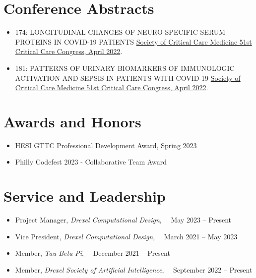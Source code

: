 \documentclass[letterpaper,11pt]{article}
\newcommand{\reusmeSubHeadingListSmallStart}{\begin{itemize}[itemsep=-4pt, parsep=4pt]}
\newcommand{\resumeSubHeadingListSmallEnd}{\end{itemize}}
\begin{document}
\section{Conference Abstracts}

\reusmeSubHeadingListSmallStart
\item\small {
    174: LONGITUDINAL CHANGES OF NEURO-SPECIFIC SERUM PROTEINS IN COVID-19 PATIENTS
    \href{https://doi.org/10.1097/01.ccm.0000807020.73561.ed}
    {Society of Critical Care Medicine 51st Critical Care Congress, April 2022}.
}

\item\small {
    181: PATTERNS OF URINARY BIOMARKERS OF IMMUNOLOGIC ACTIVATION AND SEPSIS IN PATIENTS WITH COVID-19
    \href{https://doi.org/10.1097/01.ccm.0000807048.74105.59}
    {Society of Critical Care Medicine 51st Critical Care Congress, April 2022}.
}

\resumeSubHeadingListSmallEnd

\vspace{-20pt}


\section{Awards and Honors}
\reusmeSubHeadingListSmallStart
\item\small {
    HESI GTTC Professional Development Award, Spring 2023
}

\item\small {
    Philly Codefest 2023 - Collaborative Team Award
}

\resumeSubHeadingListSmallEnd

\vspace{-20pt}



\section{Service and Leadership}

\reusmeSubHeadingListSmallStart
\item\small {
    Project Manager, \emph{Drexel Computational Design}, ~~May 2023 -- Present
}
\item\small {
    Vice President, \emph{Drexel Computational Design}, ~~March 2021 -- May 2023 \\
}
\item\small {
    Member, \emph{Tau Beta Pi}, ~~December 2021 -- Present
}
\item\small {
    Member, \emph{Drexel Society of Artificial Intelligence}, ~~September 2022 -- Present
}
\resumeSubHeadingListSmallEnd
\end{document}
